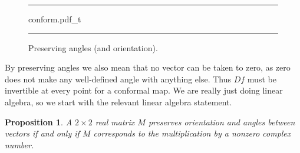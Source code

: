 \documentclass[12pt,openany]{book}
\theoremstyle{plain}
\newtheorem{prop}[thm]{Proposition}
\theoremstyle{remark}
\theoremstyle{definition}
\newenvironment{myfig}{%
\begin{figure}[h!t]
\noindent\rule{\textwidth}{0.5pt}\vspace{12pt}\par\centering}%
{\par\noindent\rule{\textwidth}{0.5pt}
\end{figure}}
\theoremstyle{exercise}
\theoremstyle{example}
\begin{document}
\begin{myfig}
{conform.pdf_t}
\caption{Preserving angles (and orientation).\label{fig:conform}}
\end{myfig}

By preserving angles we also mean that no vector can be taken to zero,
as zero does not make any well-defined angle with anything else.
Thus $Df$ must be invertible at every point for a conformal map.
We are really just doing linear algebra, so we start with the relevant
linear algebra statement.

\begin{prop}
A $2\times 2$ real matrix $M$
preserves orientation and angles
between vectors
if and only if $M$ corresponds to the multiplication by a nonzero
complex number.
\end{prop}
\end{document}

